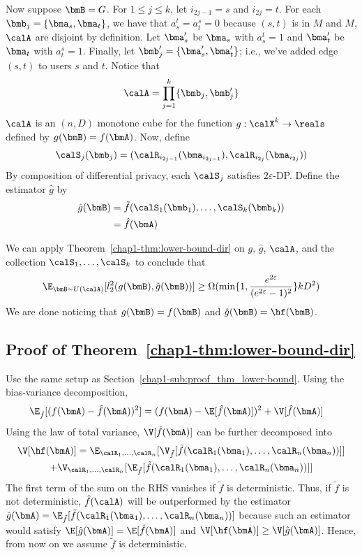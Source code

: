 Now suppose $\bmB = G$. For $1 \leq j \leq k$,
let $i_{2j-1} = s$ and $i_{2j} = t$. For each $\bmb_j = \{\bma_{s}, \bma_t\}$, 
we have that $a_s^t = a_t^s = 0$ because $(s,t)$ is in $M$ and $M$, $\calA$ are
disjoint by definition. Let $\bma_s'$ be $\bma_s$ with $a_s^t = 1$ and $\bma_t'$
be $\bma_t$ with $a_t^s = 1$. Finally, let $\bmb_j' = \{\bma_{s}', \bma_t'\}$;
i.e., we've added edge $(s,t)$ to users $s$ and $t$.
Notice that
\[
  \calA = \prod_{j=1}^k \{\bmb_j, \bmb_j'\}
\]
$\calA$ is an $(n,D)$ monotone cube for the function $g : \calX^k \rightarrow
\reals$ defined by $g(\bmB) = f(\bmA)$.
Now, define
\[
  \calS_j(\bmb_j) = (\calR_{i_{2j-1}}(\bma_{i_{2j-1}}),
  \calR_{i_{2j}}(\bma_{i_{2j}}))
\]
By composition of differential privacy, each $\calS_j$ satisfies 
$2\varepsilon$-DP.
Define the estimator $\hat{g}$ by
\begin{align*}
  \hat{g}(\bmB) &= \tilde{f}(\calS_{1}(\bmb_1), \ldots,
  \calS_{k}(\bmb_k)) \\
  &= \hat{f}(\bmA)
\end{align*}

We can apply Theorem~\ref{chap1-thm:lower-bound-dir} on $g$, $\hat{g}$, $\calA$, and 
the collection $\calS_1,\ldots, \calS_k$ to conclude that
\[
  \E_{\bmB \sim U(\calA)}[l_2^2(g(\bmB), \hat{g}(\bmB) )] \geq \Omega(\min\{1,
  \frac{e^{2\varepsilon}}{(e^{2\varepsilon}-1)^2}\}kD^2)
\]
We are done noticing that $g(\bmB) = f(\bmB)$ and $\hat{g}(\bmB) = \hf(\bmB)$.

\subsection{Proof of
Theorem~\ref{chap1-thm:lower-bound-dir}}\label{chap1-sub:proof_thm_lower-bound-dir}

Use the same setup as Section~\ref{chap1-sub:proof_thm_lower-bound}.
Using the bias-variance decomposition,
\begin{align*}
\E_{\hat{f}}[ (f(\bmA) - \hat{f}(\bmA))^2] &= (f(\bmA) - \E[\hat{f}(\bmA)])^2 + \V[\hat{f}(\bmA)]
\end{align*}
Using the law of total variance, $\V[\hat{f}(\bmA)]$ can be further decomposed into
\begin{multline*}
  \V[\hf(\bmA)] = \E_{\calR_1,\ldots,\calR_n}[\V_{\tilde{f}}[
        \tilde{f}(\calR_1(\bma_1),\ldots,\calR_n(\bma_n)) ]] \\
        +
        \V_{\calR_1,\ldots,\calR_n}[\E_{\tilde{f}}[\tilde{f}(\calR_1(\bma_1),
          \ldots,\calR_n(\bma_n))]]
\end{multline*}
The first term of the sum on the RHS vanishes if $\tilde{f}$ is deterministic.
Thus, if $\tilde{f}$ is not deterministic, $\hat{f}(\calA)$ will be outperformed by the
estimator $\hat{g}(\bmA) =
\E_{\tilde{f}}[\tilde{f}(\calR_1(\bma_1),\ldots,\calR_n(\bma_n) )]$ because such
an estimator would satisfy $\E[\hat{g}(\bmA)] = \E[\hat{f}(\bmA)]$ and
$\V[\hf(\bmA)] \geq \V[\hat{g}(\bmA)]$. Hence, from now on we assume $\tilde{f}$
is deterministic.

